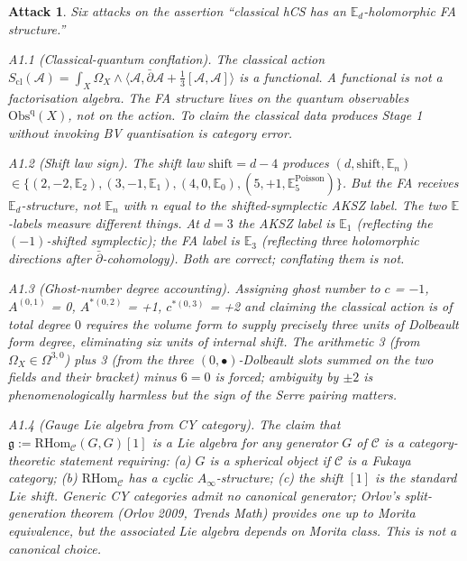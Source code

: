 \documentclass[11pt]{article}
\newtheorem*{attack}{Attack}
\theoremstyle{definition}
\providecommand{\fg}{\mathfrak{g}}
\providecommand{\cA}{\mathcal{A}}
\providecommand{\cC}{\mathcal{C}}
\providecommand{\Obs}{\mathrm{Obs}}
\begin{document}
\begin{attack}
Six attacks on the assertion ``classical hCS has an
$\mathbb{E}_d$-holomorphic FA structure.''

\emph{A1.1 (Classical-quantum conflation).} The classical action
\(
S_{\mathrm{cl}}(\cA)=\int_X \Omega_X\wedge
\langle \cA, \bar\partial\cA + \tfrac{1}{3}[\cA,\cA]\rangle
\)
is a functional. A functional is not a factorisation algebra. The FA
structure lives on the quantum observables
$\Obs^{\mathrm{q}}(X)$, not on the action. To claim the classical data
produces Stage 1 without invoking BV quantisation is category error.

\emph{A1.2 (Shift law sign).} The shift law
$\mathrm{shift} = d-4$ produces $(d, \mathrm{shift}, \mathbb{E}_n)$
$\in\{(2,-2,\mathbb{E}_2), (3,-1,\mathbb{E}_1), (4,0,\mathbb{E}_0),
(5,+1,\mathbb{E}_5^{\mathrm{Poisson}})\}$. But the FA receives
$\mathbb{E}_d$-structure, not $\mathbb{E}_n$ with $n$ equal to the
shifted-symplectic AKSZ label. The two $\mathbb{E}$-labels measure
different things. At $d=3$ the AKSZ label is $\mathbb{E}_1$
(reflecting the $(-1)$-shifted symplectic); the FA label is
$\mathbb{E}_3$ (reflecting three holomorphic directions after
$\bar\partial$-cohomology). Both are correct; conflating them is not.

\emph{A1.3 (Ghost-number degree accounting).} Assigning ghost number
to $c$ = $-1$, $A^{(0,1)}$ = 0, $A^{*(0,2)}$ = +1, $c^{*(0,3)}$ = +2
and claiming the classical action is of total degree $0$ requires the
volume form to supply precisely three units of Dolbeault form degree,
eliminating six units of internal shift. The arithmetic 3 (from
$\Omega_X\in\Omega^{3,0}$) plus 3 (from the three
$(0,\bullet)$-Dolbeault slots summed on the two fields and their
bracket) minus $6 = 0$ is forced; ambiguity by $\pm 2$ is
phenomenologically harmless but the sign of the Serre pairing matters.

\emph{A1.4 (Gauge Lie algebra from CY category).} The claim that
$\fg := \mathrm{RHom}_\cC(G, G)[1]$ is a Lie algebra for any generator
$G$ of $\cC$ is a category-theoretic statement requiring: (a) $G$ is a
spherical object if $\cC$ is a Fukaya category; (b) $\mathrm{RHom}_\cC$
has a cyclic $A_\infty$-structure; (c) the shift $[1]$ is the standard
Lie shift. Generic CY categories admit no canonical generator; Orlov's
split-generation theorem (Orlov 2009, \emph{Trends Math}) provides one
up to Morita equivalence, but the associated Lie algebra depends on
Morita class. This is \emph{not} a canonical choice.


\end{attack}
\end{document}
